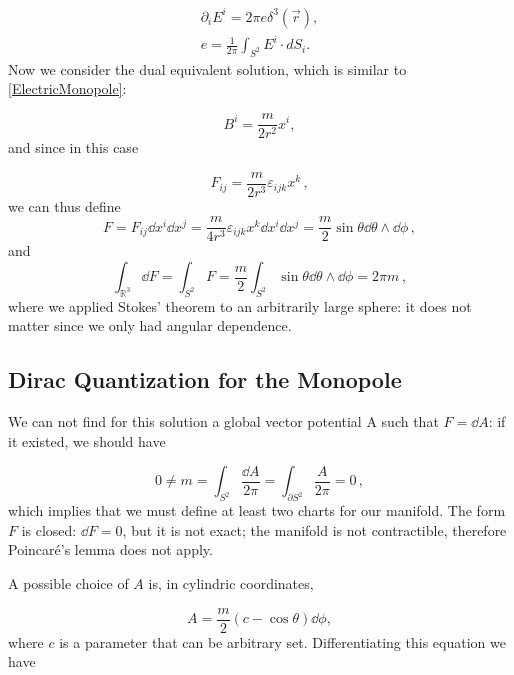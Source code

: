 \documentclass[main.tex]{subfiles}
\begin{document}
\begin{align}
\partial_i E^i=2\pi e \delta^3(\vec r),\\
e=\frac{1}{2\pi}\int_{S^2} E^i \cdot d S_i.
\end{align}
Now we consider the dual equivalent solution, which is similar to \eqref{ElectricMonopole}:

\begin{equation}\label{MagneticMonopole}
B^i=\frac{m}{2r^2}x^i,
\end{equation}
and since in this case

\begin{equation}
F_{ij}=\frac{m}{2r^3}\varepsilon_{ijk}x^k\,,
\end{equation}
%
we can thus define
%
\begin{equation}
F=F_{ij}\dd{x^i}\dd{x^j}=\frac{m}{4r^3}\varepsilon_{ijk}x^k\dd{x^i}\dd{x^j}=\frac{m}{2}\sin\theta \dd{\theta}\wedge \dd{\phi}\,,
\end{equation}
%
and
%
\begin{equation}
\int_{\mathbb R^3} \dd{F} = \int_{S^2} F=\frac{m}{2}\int_{S^2}\sin\theta \dd{\theta}\wedge \dd{\phi}=2\pi m\,,
\end{equation}
%
where we applied Stokes' theorem to an arbitrarily large sphere: it does not matter since we only had angular dependence.
\subsection{Dirac Quantization for the Monopole}
We can not find for this solution a global vector potential A such that $F=\dd{A}$: if it existed, we should have

\begin{equation}
0\neq m=\int_{S^2}\frac{\dd{A}}{2\pi}=\int_{\partial S^2}\frac{A}{2\pi}=0\,,
\end{equation}
%
which implies that we must define at least two charts for our manifold.
The form \(F\) is closed: $\dd{F}=0$, but it is not exact; the manifold is not contractible, therefore Poincaré's lemma does not apply.


A possible choice of $A$ is, in cylindric coordinates,

\begin{equation}
A=\frac{m}{2}\left(c-\cos\theta\right)\dd{\phi},
\end{equation}
where $c$ is a parameter that can be arbitrary set. Differentiating this equation we have
\end{document}
